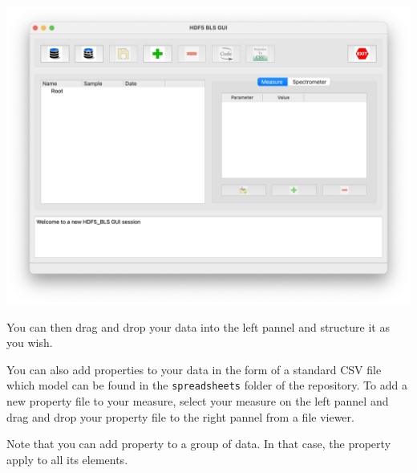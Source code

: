 \documentclass{book}
\begin{document}
            \begin{center}
                \includegraphics[width=\textwidth]{img/main_window.png}
            \end{center}

            You can then drag and drop your data into the left pannel and structure it as you wish. 
            
            You can also add properties to your data in the form of a standard CSV file which model can be found in the \texttt{spreadsheets} folder of the repository. To add a new property file to your measure, select your measure on the left pannel and drag and drop your property file to the right pannel from a file viewer. 
            
            Note that you can add property to a group of data. In that case, the property apply to all its elements.
\end{document}
